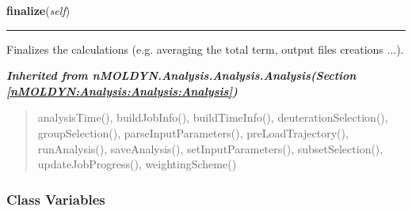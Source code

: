     \label{nMOLDYN:Analysis:Scattering:SmoothedStaticCoherentStructureFactor:finalize}

    \vspace{0.5ex}

\hspace{.8\funcindent}\begin{boxedminipage}{\funcwidth}

    \raggedright \textbf{finalize}(\textit{self})

    \vspace{-1.5ex}

    \rule{\textwidth}{0.5\fboxrule}
\setlength{\parskip}{2ex}
    Finalizes the calculations (e.g. averaging the total term, output files
    creations ...).

\setlength{\parskip}{1ex}
    \end{boxedminipage}


\large{\textbf{\textit{Inherited from nMOLDYN.Analysis.Analysis.Analysis\textit{(Section \ref{nMOLDYN:Analysis:Analysis:Analysis})}}}}

\begin{quote}
analysisTime(), buildJobInfo(), buildTimeInfo(), deuterationSelection(), groupSelection(), parseInputParameters(), preLoadTrajectory(), runAnalysis(), saveAnalysis(), setInputParameters(), subsetSelection(), updateJobProgress(), weightingScheme()
\end{quote}


  \subsubsection{Class Variables}

